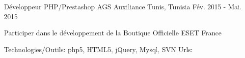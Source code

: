 \begin{cventries}
{    \href{http://www.ordre-medecins.org.tn/fr/ }{} \break
    \href{http://www.tisc.tn/ }{} \break
    \href{http://orthodontiste-narimen-djerbi.com/ }{} \break
    }    
  \techentries
    {Développeur PHP/Prestashop}
    {AGS Auxiliance}
    {Tunis, Tunisia}
    {Fév. 2015 - Mai. 2015}
    {
      \begin{cvitems}
        \item {Participer dans le développement de la Boutique Officielle ESET France}
      \end{cvitems}
    }
    {\textcolor{awesome}{Technologies/Outils: } {\color{graytext}}  {php5, HTML5, jQuery, Mysql, SVN}}
    {Urls:} 
    {\href{https://www.boutique-eset.com/}{} \break
    }
    { }\break
    { }\break
    { }\break
    { }\break
    { }\break
    { }\break
    { }\break
\end{cventries}
